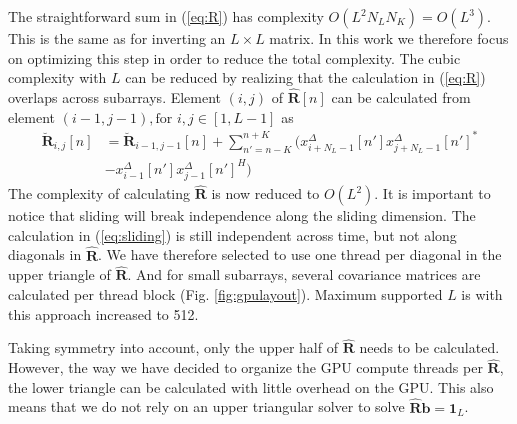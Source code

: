\documentclass[conference]{IEEEtran}
\newcommand{\mat}[1]{\mathbf{#1}}
\renewcommand{\vec}[1]{\mathbf{#1}}
\begin{document}
The straightforward sum in (\ref{eq:R}) has complexity $O(L^2N_LN_K) = O(L^3)$. %
This is the same as for inverting an $L \times L$ matrix. In this work we therefore focus on optimizing this step in order to reduce the total complexity. The cubic complexity with $L$ can be reduced by realizing that the calculation in (\ref{eq:R}) overlaps across subarrays. Element $(i,j)$ of $\mat{\hat{R}}[n]$ can be calculated from element $(i-1, j-1), \text{for } i,j \in [1, L-1]$ as
\begin{align}
\mat{\breve{R}}_{i,j}[n] &=  \mat{\breve{R}}_{i-1,j-1}[n]  + \sum_{n'=n-K}^{n+K} (x_{i+N_L-1}^{\Delta}[n']x_{j+N_L-1}^{\Delta}[n']^* \nonumber \\
 &- x_{i-1}^{\Delta}[n']x_{j-1}^{\Delta}[n']^H) \label{eq:sliding}
\end{align}
The complexity of calculating $\mat{\hat{R}}$ is now reduced to $O(L^2)$. It is important to notice that sliding will break independence along the sliding dimension. The calculation in (\ref{eq:sliding}) is still independent across time, but not along diagonals in $\mat{\hat{R}}$. We have therefore selected to use one thread per diagonal in the upper triangle of $\mat{\hat{R}}$. And for small subarrays, several covariance matrices are calculated per thread block (Fig. \ref{fig:gpulayout}). Maximum supported $L$ is with this approach increased to 512.%

Taking symmetry into account, only the upper half of $\mat{\hat{R}}$ needs to be calculated. However, the way we have decided to organize the GPU compute threads per $\mat{\hat{R}}$, the lower triangle can be calculated with little overhead on the GPU. This also means that we do not rely on an upper triangular solver to solve $\mat{\hat{R}}\vec{b} = \vec{1}_L$.%
\end{document}
